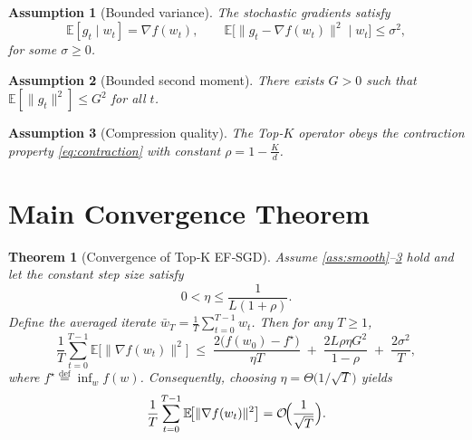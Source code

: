 \documentclass{article}
\newtheorem{theorem}{Theorem}
\newtheorem{assumption}{Assumption}
\newcommand{\E}{\mathbb{E}}
\begin{document}
\begin{assumption}[Bounded variance]\label{ass:variance}
The stochastic gradients satisfy
\[
\E[g_t\mid w_t]=\nabla f(w_t),\qquad 
\E\bigl[\|g_t-\nabla f(w_t)\|^{2}\mid w_t\bigr]\le\sigma^{2},
\]
for some $\sigma\ge0$.
\end{assumption}

\begin{assumption}[Bounded second moment]\label{ass:bounded}
There exists $G>0$ such that $\E[\|g_t\|^{2}]\le G^{2}$ for all $t$.
\end{assumption}

\begin{assumption}[Compression quality]\label{ass:compress}
The Top‑$K$ operator obeys the contraction property \eqref{eq:contraction} with constant $\rho=1-\frac{K}{d}$.
\end{assumption}

\section*{Main Convergence Theorem}
\begin{theorem}[Convergence of Top‑K EF‑SGD]\label{thm:main}
Assume \ref{ass:smooth}–\ref{ass:compress} hold and let the constant step size satisfy
\[
0<\eta\le \frac{1}{L(1+\rho)}.
\]
Define the averaged iterate $\bar w_T=\frac1T\sum_{t=0}^{T-1}w_t$.
Then for any $T\ge 1$,
\[
\frac1T\sum_{t=0}^{T-1}\E\!\bigl[\|\nabla f(w_t)\|^{2}\bigr]
\;\le\;
\frac{2\bigl(f(w_0)-f^{\star}\bigr)}{\eta T}
\;+\;
\frac{2L\rho\eta G^{2}}{1-\rho}
\;+\;
\frac{2\sigma^{2}}{T},
\]
where $f^{\star}\stackrel{\text{def}}{=}\inf_{w}f(w)$.  Consequently, choosing $\eta=\Theta\!\bigl(1/\sqrt{T}\bigr)$ yields
\[
\frac1T\sum_{t=0}^{T-1}\E\!\bigl[\|\nabla f(w_t)\|^{2}\bigr]=\mathcal O\!\Bigl(\frac{1}{\sqrt{T}}\Bigr).
\]
\end{theorem}
\end{document}
